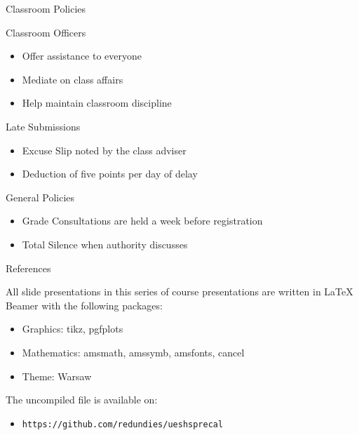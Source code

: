 \documentclass[12pt]{beamer}
\begin{document}
\begin{frame}{Classroom Policies}
 \begin{block}{Classroom Officers}
  \begin{itemize}
   \item Offer assistance to everyone
   \item Mediate on class affairs
   \item Help maintain classroom discipline
  \end{itemize}

 \end{block}

 \begin{block}{Late Submissions}
  \begin{itemize}
   \item Excuse Slip noted by the class adviser
   \item Deduction of five points per day of delay
  \end{itemize}

 \end{block}

 \begin{alertblock}{General Policies}
  \begin{itemize}
   \item Grade Consultations are held a week before registration
   \item Total Silence when authority discusses
  \end{itemize}

 \end{alertblock}

\end{frame}

\begin{frame}{References}

  All slide presentations in this series of course presentations are written in \LaTeX \, Beamer with the following packages: \\
  \begin{itemize}
   \item Graphics: tikz, pgfplots
   \item Mathematics: amsmath, amssymb, amsfonts, cancel
   \item Theme: Warsaw
  \end{itemize}

  The uncompiled file is available on: \\
  \begin{itemize}
   \item \texttt{https://github.com/redundies/ueshsprecal}
  \end{itemize}

\end{frame}
\end{document}
